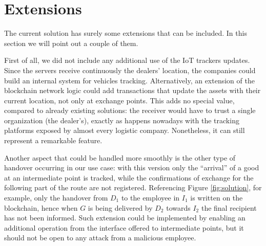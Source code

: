 \section{Extensions}
The current solution has surely some extensions that can be included. In this section we will point out a couple of them.

First of all, we did not include any additional use of the IoT trackers updates. Since the servers receive continuously the dealers' location, the companies could build an internal system for vehicles tracking. Alternatively, an extension of the blockchain network logic could add transactions that update the assets with their current location, not only at exchange points. This adds no special value, compared to already existing solutions: the receiver would have to trust a single organization (the dealer's), exactly as happens nowadays with the tracking platforms exposed by almost every logistic company. Nonetheless, it can still represent a remarkable feature.

Another aspect that could be handled more smoothly is the other type of handover occurring in our use case: with this version only the ``arrival'' of a good at an intermediate point is tracked, while the confirmations of exchange for the following part of the route are not registered. Referencing Figure \ref{fig:solution}, for example, only the handover from $D_1$ to the employee in $I_1$ is written on the blockchain, hence when $G$ is being delivered by $D_2$ towards $I_2$ the final recipient has not been informed. Such extension could be implemented by enabling an additional operation from the interface offered to intermediate points, but it should not be open to any attack from a malicious employee.

